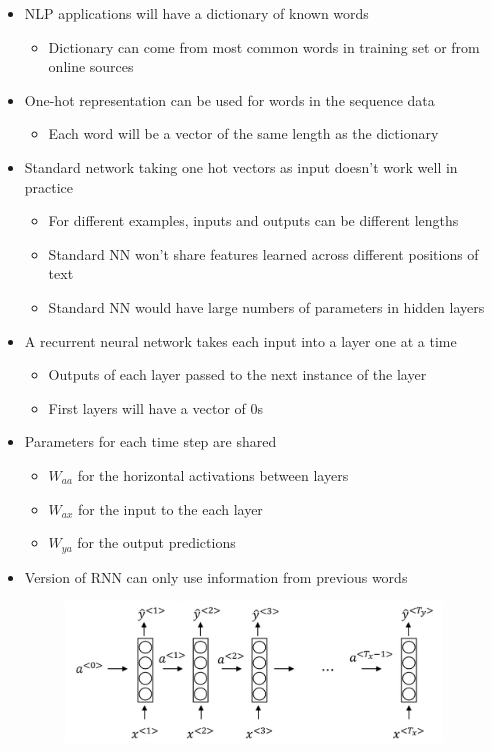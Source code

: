 \documentclass[12pt, letterpaper]{article}
\begin{document}
\begin{itemize}
        \item NLP applications will have a dictionary of known words
        \begin{itemize}
            \item Dictionary can come from most common words in training set or from online sources  
        \end{itemize}
        \item One-hot representation can be used for words in the sequence data
        \begin{itemize}
            \item Each word will be a vector of the same length as the dictionary
        \end{itemize}
        \item Standard network taking one hot vectors as input doesn't work well in practice
        \begin{itemize}
            \item For different examples, inputs and outputs can be different lengths
            \item Standard NN won't share features learned across different positions of text 
            \item Standard NN would have large numbers of parameters in hidden layers 
        \end{itemize}
        \item A recurrent neural network takes each input into a layer one at a time
        \begin{itemize}
            \item Outputs of each layer passed to the next instance of the layer
            \item First layers will have a vector of 0s
        \end{itemize}
        \item Parameters for each time step are shared
        \begin{itemize}
            \item $W_{aa}$ for the horizontal activations between layers
            \item $W_{ax}$ for the input to the each layer
            \item $W_{ya}$ for the output predictions
        \end{itemize}
        \item Version of RNN can only use information from previous words
        \begin{figure}[ht]
            \centering
            \includegraphics[width=10cm]{32.png}

\end{figure}
\end{itemize}
\end{document}
